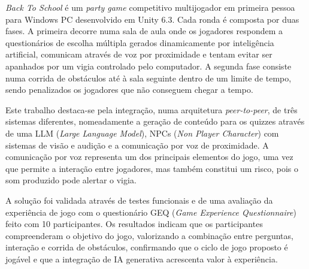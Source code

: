 




\textit{Back To School} é um \textit{party game} competitivo multijogador em primeira pessoa para Windows PC desenvolvido em Unity 6.3. Cada ronda é composta por duas fases. A primeira decorre numa sala de aula onde os jogadores respondem a questionários de escolha múltipla gerados dinamicamente por inteligência artificial, comunicam através de voz por proximidade e tentam evitar ser apanhados por um vigia controlado pelo computador. A segunda fase consiste numa corrida de obstáculos até à sala seguinte dentro de um limite de tempo, sendo penalizados os jogadores que não conseguem chegar a tempo.

Este trabalho destaca-se pela integração, numa arquitetura \textit{peer-to-peer}, de três sistemas diferentes, nomeadamente a geração de conteúdo para os quizzes através de uma LLM (\textit{Large Language Model}), NPCs (\textit{Non Player Character}) com sistemas de visão e audição e a comunicação por voz de proximidade. A comunicação por voz representa um dos principais elementos do jogo, uma vez que permite a interação entre jogadores, mas também constitui um risco, pois o som produzido pode alertar o vigia.

A solução foi validada através de testes funcionais e de uma avaliação da experiência de jogo com o questionário GEQ (\textit{Game Experience Questionnaire}) feito com 10 participantes. Os resultados indicam que os participantes compreenderam o objetivo do jogo, valorizando a combinação entre perguntas, interação e corrida de obstáculos, confirmando que o ciclo de jogo proposto é jogável e que a integração de IA generativa acrescenta valor à experiência.






